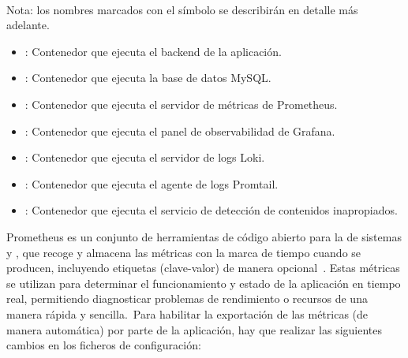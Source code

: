 	{\footnotesize Nota: los nombres marcados con el símbolo \textsuperscript{\textasteriskcentered} se describirán en
detalle más adelante.}

\begin{itemize}
	\item {}: Contenedor que ejecuta el backend de la aplicación.
	\item {}: Contenedor que ejecuta la base de datos MySQL\@.
	\item {}: Contenedor que ejecuta el servidor de métricas
	de Prometheus.
	\item {}: Contenedor que ejecuta el panel de observabilidad
	de Grafana.
	\item {}: Contenedor que ejecuta el servidor de logs Loki.
	\item {}: Contenedor que ejecuta el agente de logs
	Promtail.
	\item {}: Contenedor que ejecuta el servicio de detección de
	contenidos inapropiados\@.
\end{itemize}
\label{itm:docker-compose-services}

Prometheus es un conjunto de herramientas de código abierto para la  de sistemas y
, que recoge y
almacena las métricas con la marca de tiempo cuando se producen, incluyendo etiquetas (clave-valor) de manera
opcional~\cite{prometheus-overview}.
Estas métricas se utilizan para determinar el funcionamiento y estado de la aplicación en tiempo real, permitiendo
diagnosticar problemas de rendimiento o recursos de una manera rápida y sencilla.\ Para habilitar la exportación de
las métricas (de manera automática) por parte de la aplicación, hay que realizar las siguientes cambios en los
ficheros de configuración:

